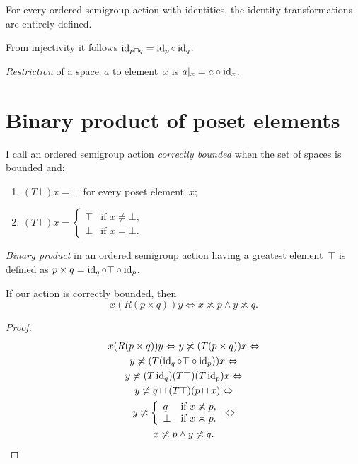 \begin{obvious}
For every ordered semigroup action with identities, the identity transformations are entirely defined.
\end{obvious}

From injectivity it follows $\operatorname{id}_{p\sqcap q} = \operatorname{id}_p\circ\operatorname{id}_q$.

\emph{Restriction} of a space~$a$ to element~$x$ is $a|_x=a\circ\operatorname{id}_x$.

\chapter{Binary product of poset elements}

\begin{defn}
I call an ordered semigroup action \emph{correctly bounded} when the set of spaces is bounded and:
\begin{enumerate}
\item $(T\bot)x = \bot$ for every poset element~$x$;
\item $(T\top)x =
\left\{\begin{array}{ll}\top&\text{if }x\ne\bot,\\\bot&\text{if }x=\bot.\end{array}\right.$
\end{enumerate}
\end{defn}

\emph{Binary product} in an ordered semigroup action having a greatest element~$\top$ is defined as $p\times q=\operatorname{id}_q\circ\top\circ\operatorname{id}_p$.

\begin{thm}
If our action is correctly bounded, then
\[ x(R(p\times q))y\Leftrightarrow x\nasymp p\land y\nasymp q. \]
\end{thm}

\begin{proof}
\begin{multline*}
x(R(p\times q))y \Leftrightarrow
y\not\asymp(T(p\times q))x \Leftrightarrow \\
y\not\asymp(T(\operatorname{id}_q\circ\top\circ\operatorname{id}_p))x \Leftrightarrow \\
y\not\asymp (T\operatorname{id}_q)(T\top)(T\operatorname{id}_p)x \Leftrightarrow \\
y\not\asymp q\sqcap(T\top)(p\sqcap x) \Leftrightarrow \\
y\not\asymp
\left\{\begin{array}{ll}q&\text{if }x\not\asymp p,\\\bot&\text{if }x\asymp p.\end{array}\right. \Leftrightarrow \\
x\not\asymp p\land y\not\asymp q.
\end{multline*}
\end{proof}

